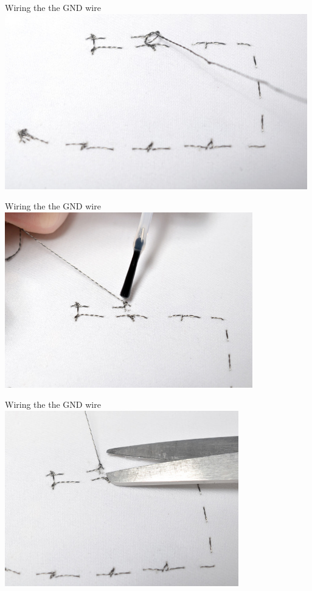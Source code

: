 \documentclass{beamer}
\begin{document}
\begin{frame}[fragile]{Wiring the the GND wire}
\includegraphics[height=3in]{flora_DSC_0121.jpg}
\end{frame}
\begin{frame}[fragile]{Wiring the the GND wire}
\includegraphics[height=3in]{flora_DSC_0123.jpg}
\end{frame}
\begin{frame}[fragile]{Wiring the the GND wire}
\includegraphics[height=3in]{flora_DSC_0125.jpg}
\end{frame}
\end{document}
